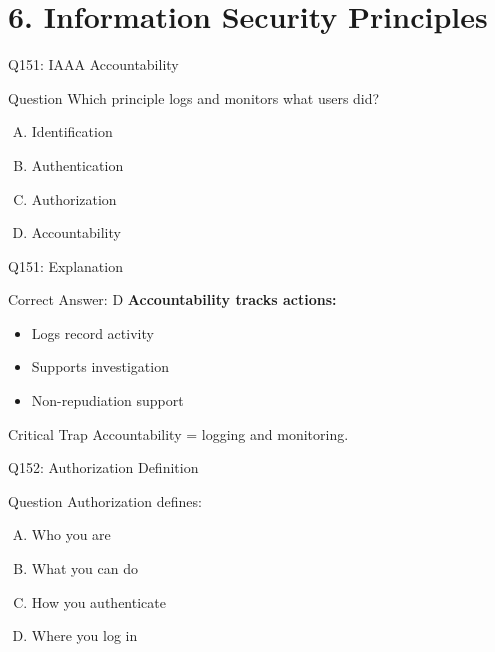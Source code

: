 \documentclass{beamer}
\begin{document}
	\section{6. Information Security Principles}
	
	\begin{frame}{Q151: IAAA Accountability}
		\begin{block}{Question}
			Which principle logs and monitors what users did?
		\end{block}
		\begin{enumerate}[(A)]
			\item Identification
			\item Authentication
			\item Authorization
			\item Accountability
		\end{enumerate}
	\end{frame}
	
	\begin{frame}{Q151: Explanation}
		\begin{block}{Correct Answer: D}
			\textbf{Accountability tracks actions:}
			\begin{itemize}
				\item Logs record activity
				\item Supports investigation
				\item Non-repudiation support
			\end{itemize}
		\end{block}
		\begin{alertblock}{Critical Trap}
			Accountability = logging and monitoring.
		\end{alertblock}
	\end{frame}
	
	\begin{frame}{Q152: Authorization Definition}
		\begin{block}{Question}
			Authorization defines:
		\end{block}
		\begin{enumerate}[(A)]
			\item Who you are
			\item What you can do
			\item How you authenticate
			\item Where you log in
		\end{enumerate}
	\end{frame}
	
\end{document}
